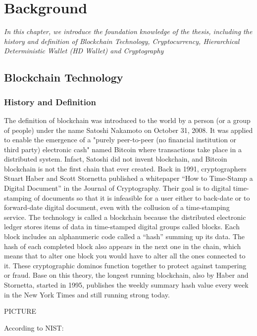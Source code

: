 \chapter{Background} \label{background}

\label{chap:background}
	\textit{In this chapter, we introduce the foundation knowledge of the thesis, including the history and definition of Blockchain Technology, Cryptocurrency, 
	Hierarchical Deterministic Wallet (HD Wallet) and Cryptography}
\minitoc

\section{Blockchain Technology}

\subsection{History and Definition}

The definition of blockchain was introduced to the world by a person (or a group of people) under the name Satoshi Nakamoto on October 31, 2008. 
It was applied to enable the emergence of a "purely peer-to-peer (no financial institution or third party) electronic cash" named Bitcoin where transactions take place in a distributed system.
Infact, Satoshi did not invent blockchain, and Bitcoin blockchain is not the first chain that ever created. 
Back in 1991, cryptographers Stuart Haber and Scott Stornetta published a whitepaper “How to Time-Stamp a Digital Document” in the Journal of Cryptography. 
Their goal is to digital time-stamping of documents so that it is infeasible for a user either to back-date or to forward-date digital document, even with the collusion of a time-stamping service. 
The technology is called a blockchain because the distributed electronic ledger stores items of data in time-stamped digital groups called blocks. Each block includes an alphanumeric code called a “hash” summing up its data. The hash of each completed block also appears in the next one in the chain, which means that to alter one block you would have to alter all the ones connected to it. These cryptographic dominos function together to protect against tampering or fraud.
Base on this theory, the longest running blockchain, also by Haber and Stornetta, started in 1995, publishes the weekly summary hash value every week in the New York Times and still running strong today. 

PICTURE

According to NIST:

